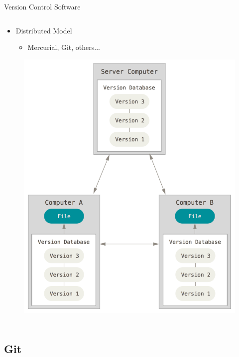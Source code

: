 \documentclass[11pt,professionalfonts]{beamer}
\begin{document}
\begin{frame}{Version Control Software}
\begin{columns}
\begin{column}[t]{0.5\textwidth}
\begin{itemize}
    \item Distributed Model
    \begin{itemize}
        \item Mercurial, Git, others...
    \end{itemize}
\end{itemize}
\begin{figure}
    \centering
    \includegraphics[height=0.6\textheight]{figures/distributed.png}
\end{figure}

\end{column}
\end{columns}

\end{frame}%

\section*{}
\subsection*{Git}
\end{document}
